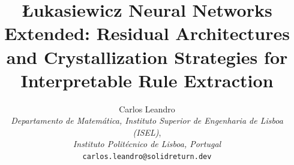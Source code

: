 \documentclass[12pt,a4paper]{article}
\begin{document}
\title{\L{}ukasiewicz Neural Networks Extended: Residual Architectures and
       Crystallization Strategies for Interpretable Rule Extraction}

\author{Carlos Leandro\\
  \textit{Departamento de Matem\'atica,
  Instituto Superior de Engenharia de Lisboa (ISEL)},\\
  \textit{Instituto Polit\'ecnico de Lisboa, Portugal}\\
  \texttt{carlos.leandro@solidreturn.dev}}

\date{}
\maketitle

\end{document}
